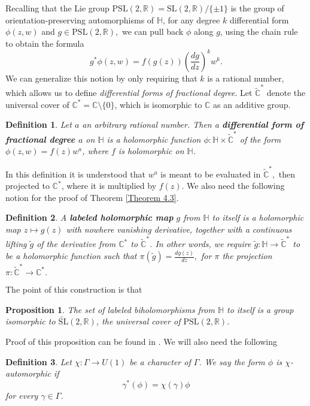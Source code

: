 \documentclass{article}
\newtheorem{proposition}{Proposition}[section]
\newtheorem{definition}{Definition}[section]
\begin{document}
Recalling that the Lie group $\mathrm{PSL}(2, \mathbb{R}) = \mathrm{SL}(2,\mathbb{R})/\{ \pm 1\}$ is the group of orientation-preserving automorphisms of $\mathbb{H}$, for any degree $k$ differential form $\phi(z,w)$ and $g \in \mathrm{PSL}(2, \mathbb{R}),$ we can pull back $\phi$ along $g$, using the chain rule to obtain the formula
\[g^*\phi(z,w) = f(g(z))\left(\frac{dg}{dz}\right)^kw^k.\]
We can generalize this notion by only requiring that $k$ is a rational number, which allows us to define \textit{differential forms of fractional degree}. Let $\widetilde{\mathbb{C}}^*$ denote the universal cover of $\mathbb{C}^* = \mathbb{C}\setminus \{0\}$, which is isomorphic to $\mathbb{C}$ as an additive group. 
\begin{definition}
Let $a$ an arbitrary rational number. Then a \textbf{differential form of fractional degree $a$} on $\mathbb{H}$ is a holomorphic function $\phi: \mathbb{H} \times \widetilde{\mathbb{C}}^*$ of the form $\phi(z,w) = f(z) w^{a}$, where $f$ is holomorphic on $\mathbb{H}$.
\end{definition}
In this definition it is understood that $w^a$ is meant to be evaluated in $\widetilde{\mathbb{C}}^*,$ then projected to $\mathbb{C}^*$, where it is multiplied by $f(z)$. We also need the following notion for the proof of Theorem \ref{Theorem 4.3}.
\begin{definition}
A \textbf{labeled holomorphic map} $g$ from $\mathbb{H}$ to itself is a holomorphic map $z \mapsto g(z)$ with nowhere vanishing derivative, together with a continuous lifting $\tilde{g}$ of the derivative from $\mathbb{C}^*$ to $\widetilde{\mathbb{C}}^{\ast}$. In other words, we require $\tilde{g}:\mathbb{H} \to \widetilde{\mathbb{C}}^{\ast}$ to be a holomorphic function such that $\pi(\tilde{g}) = \frac{dg(z)}{dz},$ for $\pi$ the projection $\pi: \widetilde{\mathbb{C}}^{\ast} \to \mathbb{C}^*.$
\end{definition}
The point of this construction is that 
\begin{proposition}
The set of labeled biholomorphisms from $\mathbb{H}$ to itself is a group isomorphic to $\widetilde{\mathrm{SL}}(2,\mathbb{R})$, the universal cover of $\mathrm{PSL}(2,\mathbb{R}).$
\end{proposition}
Proof of this proposition can be found in \cite{milnor_1975}. We will also need the following
\begin{definition}
Let $\chi: \Gamma \to U(1)$ be a character of $\Gamma$. We say the form $\phi$ is $\chi$-automorphic if
\[\gamma^*(\phi) = \chi(\gamma)\phi\]
for every $\gamma \in \Gamma$.
\end{definition}
\end{document}
